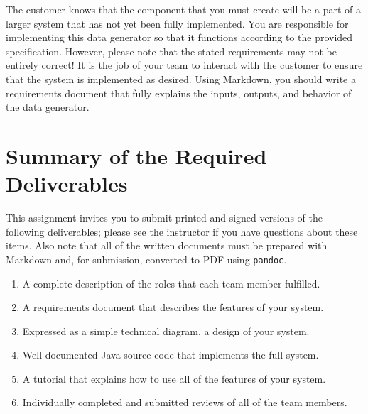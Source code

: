 The customer knows that the component that you must create will be a part of a larger system that has not yet been
fully implemented.  You are responsible for implementing this data generator so that it functions according to the
provided specification.  However, please note that the stated requirements may not be entirely correct!  It is the job
of your team to interact with the customer to ensure that the system is implemented as desired.  Using Markdown, you
should write a requirements document that fully explains the inputs, outputs, and behavior of the data generator.



\section*{Summary of the Required Deliverables}

This assignment invites you to submit printed and signed versions of the following deliverables; please see the
instructor if you have questions about these items. Also note that all of the written documents must be prepared with
Markdown and, for submission, converted to PDF using {\tt pandoc}.

\vspace*{-.1in}
\begin{enumerate}
  \setlength{\itemsep}{0in}
  \item A complete description of the roles that each team member fulfilled.
  \item A requirements document that describes the features of your system.
  \item Expressed as a simple technical diagram, a design of your system.
  \item Well-documented Java source code that implements the full system.
  \item A tutorial that explains how to use all of the features of your system.
  \item Individually completed and submitted reviews of all of the team members.
\end{enumerate}
\vspace*{-.1in}


